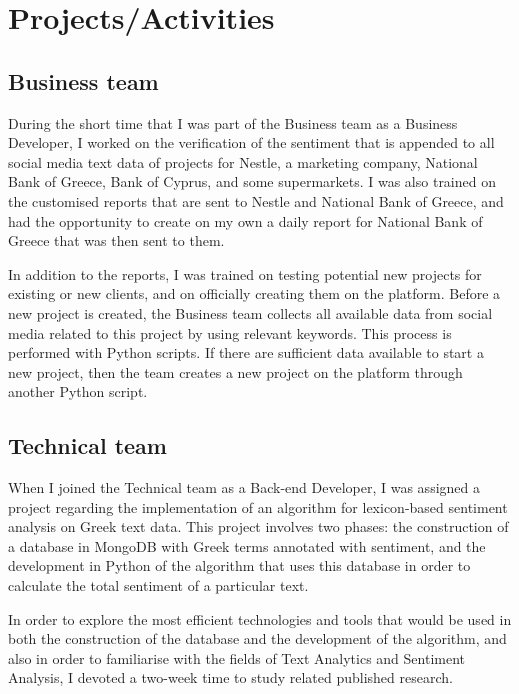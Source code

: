 \section{Projects/Activities}
\label{sec:projects}

\subsection{Business team}
\label{subsec:business-activities}

During the short time that I was part
of the Business team as a Business Developer,
I worked on the verification of the sentiment
that is appended to all social media text data
of projects for Nestle, a marketing company, National Bank of Greece,
Bank of Cyprus, and some supermarkets.
I was also trained on the customised reports
that are sent to Nestle and National Bank of Greece,
and had the opportunity
to create on my own a daily report for National Bank of Greece
that was then sent to them.

In addition to the reports,
I was trained on testing potential new projects
for existing or new clients,
and on officially creating them on the platform.
Before a new project is created,
the Business team collects all available data from social media
related to this project
by using relevant keywords.
This process is performed with Python scripts.
If there are sufficient data available
to start a new project,
then the team creates a new project on the platform
through another Python script.


\subsection{Technical team}
\label{subsec:technical-activities}

When I joined the Technical team as a Back-end Developer,
I was assigned a project regarding the implementation of an algorithm
for lexicon-based sentiment analysis on Greek text data.
This project involves two phases:
the construction of a database in MongoDB
with Greek terms annotated with sentiment,
and the development in Python of the algorithm
that uses this database
in order to calculate the total sentiment of a particular text.

In order to explore the most efficient technologies and tools
that would be used in both the construction of the database
and the development of the algorithm,
and also in order to familiarise with the fields
of Text Analytics and Sentiment Analysis,
I devoted a two-week time to study related published research.

